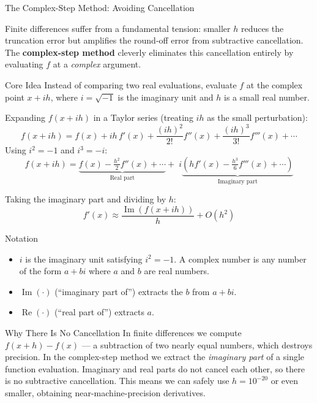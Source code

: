 \documentclass[aspectratio=169,10pt]{beamer}
\begin{document}
\begin{frame}[allowframebreaks]{The Complex-Step Method: Avoiding Cancellation}

  Finite differences suffer from a fundamental tension: smaller $h$ reduces
  the truncation error but amplifies the round-off error from subtractive
  cancellation.  The \textbf{complex-step method} cleverly eliminates this
  cancellation entirely by evaluating $f$ at a \emph{complex} argument.

  \begin{block}{Core Idea}
    Instead of comparing two real evaluations, evaluate $f$ at the
    complex point $x + ih$, where $i = \sqrt{-1}$ is the imaginary unit
    and $h$ is a small real number.
  \end{block}

  Expanding $f(x+ih)$ in a Taylor series (treating $ih$ as the small
  perturbation):
  \[
    f(x+ih)
    = f(x)
    + ih\,f'(x)
    + \frac{(ih)^2}{2!} f''(x)
    + \frac{(ih)^3}{3!} f'''(x)
    + \cdots
  \]
  Using $i^2 = -1$ and $i^3 = -i$:
  \[
    f(x+ih)
    = \underbrace{f(x) - \tfrac{h^2}{2} f''(x) + \cdots}_{\text{Real part}}
    +\; i\underbrace{\left(h f'(x) - \tfrac{h^3}{6} f'''(x) + \cdots\right)}_{\text{Imaginary part}}
  \]

  Taking the imaginary part and dividing by $h$:
  \[
    \boxed{f'(x)
    \approx \frac{\operatorname{Im}(f(x+ih))}{h} + O(h^2)}
  \]

  \framebreak

  \begin{block}{Notation}
    \begin{itemize}
      \item $i$ is the imaginary unit satisfying $i^2 = -1$.  A complex
            number is any number of the form $a + bi$ where $a$ and $b$
            are real numbers.
      \item $\operatorname{Im}(\cdot)$ (``imaginary part of'') extracts
            the $b$ from $a + bi$.
      \item $\operatorname{Re}(\cdot)$ (``real part of'') extracts $a$.
    \end{itemize}
  \end{block}

  \begin{alertblock}{Why There Is No Cancellation}
    In finite differences we compute $f(x+h) - f(x)$ --- a subtraction
    of two nearly equal numbers, which destroys precision.  In the
    complex-step method we extract the \emph{imaginary part} of a single
    function evaluation.  Imaginary and real parts do not cancel each
    other, so there is no subtractive cancellation.  This means we can
    safely use $h = 10^{-20}$ or even smaller, obtaining near-machine-precision
    derivatives.
  \end{alertblock}


\end{frame}
\end{document}
